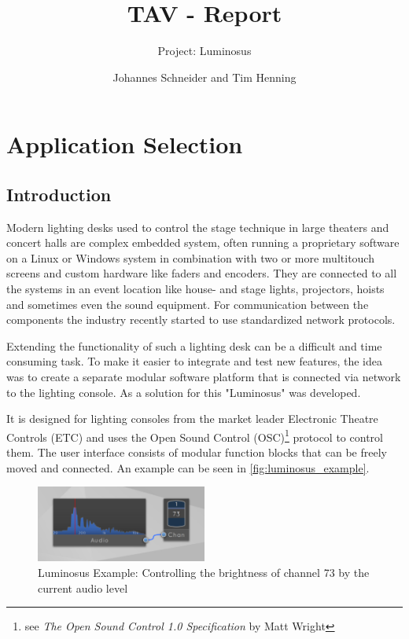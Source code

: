 \documentclass{scrreprt}
\title{TAV - Report}
\subtitle{Project: Luminosus}
\author{Johannes Schneider and Tim Henning}
\begin{document}
\maketitle

\setcounter{chapter}{-1}
\chapter{Application Selection}

\section{Introduction}

Modern lighting desks used to control the stage technique in large theaters and concert halls are complex embedded system, often running a proprietary software on a Linux or Windows system in combination with two or more multitouch screens and custom hardware like faders and encoders. They are connected to all the systems in an event location like house- and stage lights, projectors, hoists and sometimes even the sound equipment. For communication between the components the industry recently started to use standardized network protocols.

Extending the functionality of such a lighting desk can be a difficult and time consuming task. To make it easier to integrate and test new features, the idea was to create a separate modular software platform that is connected via network to the lighting console. As a solution for this "Luminosus" was developed.

It is designed for lighting consoles from the market leader Electronic Theatre Controls (ETC) and uses the Open Sound Control (OSC)\footnote{see \textit{The Open Sound Control 1.0 Specification} by Matt Wright} protocol to control them. The user interface consists of modular function blocks that can be freely moved and connected. An example can be seen in \vref{fig:luminosus_example}.

\begin{figure}[h]
	\centering
	\includegraphics[width=0.5\textwidth]{img/luminosus_example}
	\caption[Luminosus Example]{Luminosus Example: Controlling the brightness of channel 73 by the current audio level}
	\label{fig:luminosus_example}
\end{figure}
\end{document}
